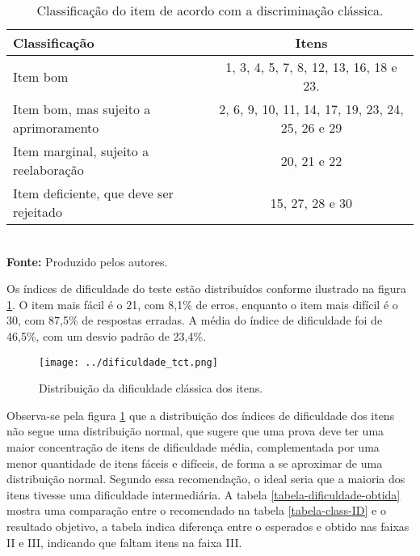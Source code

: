 \begin{table}[!htb]
	\centering
	\caption{Classificação do item de acordo com a discriminação clássica.}
	\label{class-disc-classica2}
	\begin{tabular}{lc}
		\hline
		\textbf{Classificação}  & \textbf{Itens}  \\ 
		\hline
	    Item bom  & 1, 3, 4, 5, 7, 8, 12, 13, 16, 18 e 23.  \\ 
		\hline
		Item bom, mas sujeito a aprimoramento & 2, 6, 9, 10, 11, 14, 17, 19, 23, 24, 25, 26 e 29\\ 
		\hline
		Item marginal, sujeito a reelaboração & 20, 21 e 22\\ 
		\hline
		Item deficiente, que deve ser rejeitado &  15, 27, 28 e 30\\ 
		\hline
	\end{tabular}\\
	\vspace*{0.5cm}
	\small \textbf{Fonte:} Produzido pelos autores.
\end{table}

Os índices de dificuldade do teste estão distribuídos conforme ilustrado na figura \ref{fig:hist_difi}. O item mais fácil é o 21, com 8,1\% de erros, enquanto o item mais difícil é o 30, com 87,5\% de respostas erradas. A média do índice de dificuldade foi de 46,5\%, com um desvio padrão de 23,4\%.

\begin{figure}[H]
	\centering
	\caption{Distribuição da dificuldade clássica dos itens.}
	\texttt{[image: ../dificuldade\_tct.png]}
	\parbox{\textwidth}{
		\centering %
	}
	\label{fig:hist_difi}
\end{figure}


Observa-se pela figura \ref{fig:hist_difi} que a distribuição dos índices de dificuldade dos itens não segue uma distribuição normal, que sugere que uma prova deve ter uma maior concentração de itens de dificuldade média, complementada por uma menor quantidade de itens fáceis e difíceis, de forma a se aproximar de uma distribuição normal. Segundo essa recomendação, o ideal seria que a maioria dos itens tivesse uma dificuldade intermediária. A tabela \ref{tabela-dificuldade-obtida} mostra uma comparação entre o recomendado na tabela \ref{tabela-class-ID} e o resultado objetivo, a tabela indica diferença entre o esperados e obtido nas faixas II e III, indicando que faltam itens na faixa III.

